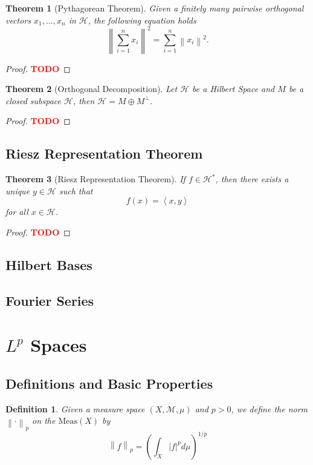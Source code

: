 \documentclass{article}
\newtheorem*{theorem}{Theorem}
\newtheorem*{definition}{Definition}
\newcommand{\M}{\mathcal{M}}
\renewcommand{\H}{\mathcal{H}}
\newcommand{\lnorm}[2]{\left\lVert#2 \right\rVert_{#1}}
\newcommand{\inner}[2]{\left\langle#1 , #2 \right\rangle}
\newcommand{\norm}[1]{\left\lVert#1 \right\rVert}
\newcommand{\td}{\textcolor{red}{\textbf{TODO}}}
\begin{document}
\begin{theorem}[Pythagorean Theorem]
    Given a finitely many pairwise orthogonal vectors $x_1, ..., x_n$ in $\H$, the following equation holds
    $$\norm{\sum_{i=1}^{n}x_i}^2 = \sum_{i=1}^{n}\norm{x_i}^2.$$
\end{theorem}

\begin{proof}
    \td
\end{proof}

\begin{theorem}[Orthogonal Decomposition]
    Let $\H$ be a Hilbert Space and $M$ be a closed subspace $\H$, then $\H = M \oplus M^{\perp}$.
\end{theorem}

\begin{proof}
    \td 
\end{proof}

\subsection{Riesz Representation Theorem}

\begin{theorem}[Riesz Representation Theorem]
    If $f \in \H^*$, then there exists a unique $y \in \H$ such that
    $$f(x) = \inner{x}{y}$$
    for all $x \in \H$.
\end{theorem}

\begin{proof}
    \td 
\end{proof}

\subsection{Hilbert Bases}

\subsection{Fourier Series}

\section{$L^p$ Spaces}

\subsection{Definitions and Basic Properties}

\begin{definition}
    Given a measure space $(X, \M, \mu)$ and $p > 0$, we define the norm $\lnorm{p}{\cdot}$ on the $\text{Meas}(X)$ by
    $$\lnorm{p}{f} = \left(\int_X |f|^p d\mu \right)^{1/p}$$
\end{definition}
\end{document}
